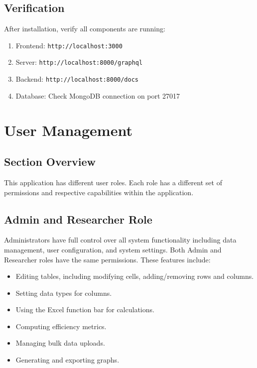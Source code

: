 \documentclass[12pt]{article}
\begin{document}
\subsection{Verification}
After installation, verify all components are running:
\begin{enumerate}
    \item Frontend: \texttt{http://localhost:3000}
    \item Server: \texttt{http://localhost:8000/graphql}
    \item Backend: \texttt{http://localhost:8000/docs}
    \item Database: Check MongoDB connection on port 27017
\end{enumerate}

\section{User Management}
\subsection*{Section Overview}
This application has different user roles. Each role has a different set of
permissions and respective capabilities within the application.

\subsection{Admin and Researcher Role}
Administrators have full control over all system functionality including data
management, user configuration, and system settings. Both Admin and Researcher
roles have the same permissions. \newline \newline
These features include:
\begin{itemize}
    \item Editing tables, including modifying cells, adding/removing rows and columns.
    \item Setting data types for columns.
    \item Using the Excel function bar for calculations.
    \item Computing efficiency metrics.
    \item Managing bulk data uploads.
    \item Generating and exporting graphs.
\end{itemize}
\end{document}
